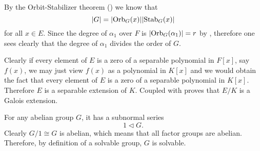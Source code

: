 \begin{questions}
    \item By the Orbit-Stabilizer theorem () we know that
    \[
       |G| = |\mathrm{Orb}_{G}(x)||\mathrm{Stab}_{G}(x)| 
    \]
    for all $x \in E$. Since the degree of $\alpha_1$ over $F$ is $|\mathrm{Orb}_{G}(\alpha_1)| = r$ by , therefore one sees clearly that the degree of $\alpha_1$ divides the order of $G$.

    \item Clearly if every element of $E$ is a zero of a separable polynomial in $F[x]$, say $f(x)$, we may just view $f(x)$ as a polynomial in $K[x]$ and we would obtain the fact that every element of $E$ is a zero of a separable polynomial in $K[x]$. Therefore $E$ is a separable extension of $K$. Coupled with  proves that $E/K$ is a Galois extension.
    
    \item For any abelian group $G$, it has a subnormal series
    \[
        1 \lhd G.
    \]
    Clearly $G/1 \cong G$ is abelian, which means that all factor groups are abelian. Therefore, by definition of a solvable group, $G$ is solvable.
\end{questions}
